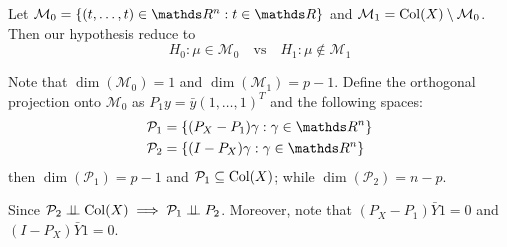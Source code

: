 \documentclass[12pt]{extarticle}
\begin{document}
Let $\mathcal M_0 = \{ (t, \dots, t) \in \R^n : t \in \R \}$ and $\mathcal M_1= {\operatorfont Col}(X) \setminus \mathcal M_0$.
Then our hypothesis reduce to
\begin{equation}
    H_0: \mu \in \mathcal M_0 \quad \text{vs} \quad H_1: \mu \notin \mathcal M_1
\end{equation}

Note that $\dim(\mathcal M_0) = 1$ and $\dim(\mathcal M_1) = p-1$.
Define the orthogonal projection onto $\mathcal M_0$ as $P_1 y = \bar y (1, \dots, 1)^T$
and the following spaces:
\begin{align}
    \mathcal P_1 & = \{ (P_X - P_1)\gamma : \gamma \in \R^n \} \\
    \mathcal P_2 & = \{ (I - P_X)\gamma : \gamma \in \R^n \}
\end{align}
then $\dim(\mathcal P_1) = p-1$ and $\mathcal P_1  \subseteq {\operatorfont Col}(X)$;
while $\dim(\mathcal P_2) = n - p$.

Since $\mathcal P_2 \indep {\operatorfont Col}(X) \implies \mathcal P_1 \indep P_2$.
Moreover, note that $(P_X - P_1) \bar Y1 = 0$ and $(I - P_X) \bar Y1 = 0$.
\end{document}
